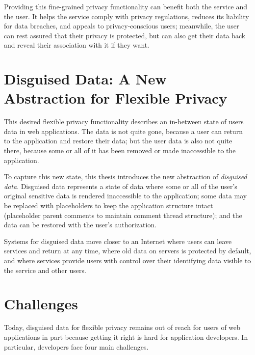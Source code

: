%
Providing this fine-grained privacy functionality can benefit both the service
and the user.
%
It helps the service comply with privacy regulations, reduces its liability for
data breaches, and appeals to privacy-conscious users; meanwhile, the user can
rest assured that their privacy is protected, but can also get their data back
and reveal their association with it if they want.


\section{Disguised Data: A New Abstraction for Flexible Privacy}
%
This desired flexible privacy functionality describes an in-between state of
users data in web applications. The data is not quite gone, because a user
can return to the application and restore their data; but the user data is
also not quite there, because some or all of it has been removed or made
inaccessible to the application.
%

%
To capture this new state, this thesis introduces the new 
abstraction of \emph{disguised data}.  Disguised data represents a state of data
where \one{} some or all of the user's original sensitive data is rendered
inaccessible to the application; \two{} some data may be replaced with
placeholders to keep the application structure intact (\eg placeholder parent
comments to maintain comment thread structure); and \three{} the data can be
restored with the user's authorization.
%

%
Systems for disguised data move closer to an Internet where
users can leave services and return at any time, where old data on servers is
protected by default, and where services provide users with control over their
identifying data visible to the service and other users.
%

\section{Challenges} 
Today, disguised data for flexible privacy remains out of reach for users of
web applications in part because getting it right is hard for application
developers. In particular, developers face four main challenges.

